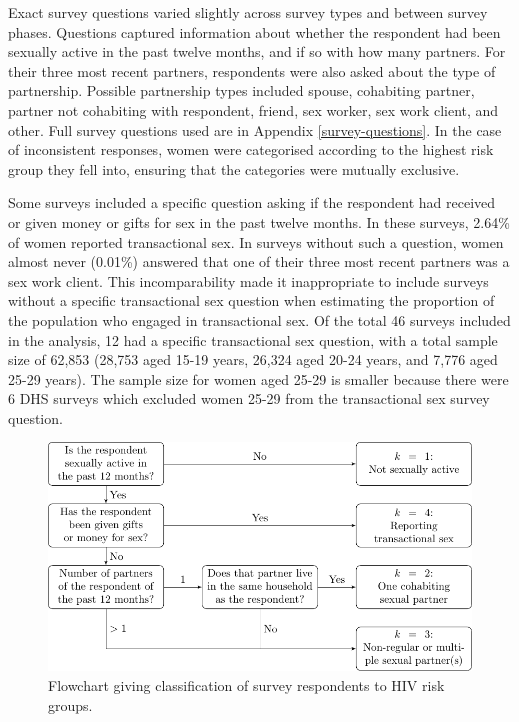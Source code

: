 \documentclass[a4paper, nobind]{templates/ociamthesis}
\begin{document}
Exact survey questions varied slightly across survey types and between survey phases.
Questions captured information about whether the respondent had been sexually active in the past twelve months, and if so with how many partners.
For their three most recent partners, respondents were also asked about the type of partnership.
Possible partnership types included spouse, cohabiting partner, partner not cohabiting with respondent, friend, sex worker, sex work client, and other.
Full survey questions used are in Appendix \ref{survey-questions}.
In the case of inconsistent responses, women were categorised according to the highest risk group they fell into, ensuring that the categories were mutually exclusive.

Some surveys included a specific question asking if the respondent had received or given money or gifts for sex in the past twelve months.
In these surveys, 2.64\% of women reported transactional sex.
In surveys without such a question, women almost never (0.01\%) answered that one of their three most recent partners was a sex work client.
This incomparability made it inappropriate to include surveys without a specific transactional sex question when estimating the proportion of the population who engaged in transactional sex.
Of the total 46 surveys included in the analysis, 12 had a specific transactional sex question, with a total sample size of 62,853 (28,753 aged 15-19 years, 26,324 aged 20-24 years, and 7,776 aged 25-29 years).
The sample size for women aged 25-29 is smaller because there were 6 DHS surveys which excluded women 25-29 from the transactional sex survey question.



\begin{figure}
\includegraphics[width=0.95\linewidth]{figures/multi-agyw/category-flowchart} \caption{Flowchart giving classification of survey respondents to HIV risk groups.}\label{fig:category-flowchart}
\end{figure}
\end{document}
